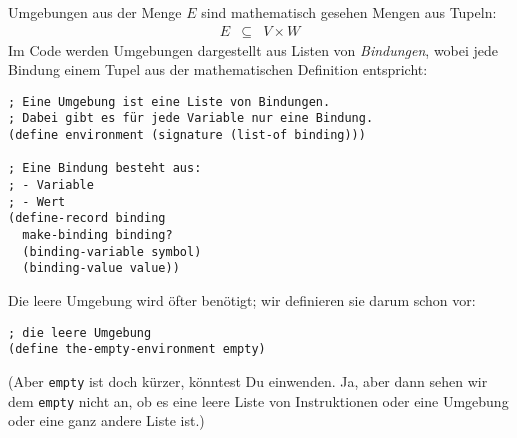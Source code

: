 Umgebungen aus der Menge $E$ sind mathematisch gesehen Mengen aus
Tupeln:
%
\begin{eqnarray*}
  E &\subseteq& V\times W
\end{eqnarray*}
%
Im Code werden Umgebungen dargestellt aus Listen von
\textit{Bindungen}, wobei jede Bindung einem Tupel aus
der mathematischen Definition entspricht:
%
\begin{lstlisting}
; Eine Umgebung ist eine Liste von Bindungen.
; Dabei gibt es für jede Variable nur eine Bindung.
(define environment (signature (list-of binding)))

; Eine Bindung besteht aus:
; - Variable
; - Wert
(define-record binding
  make-binding binding?
  (binding-variable symbol)
  (binding-value value))
\end{lstlisting}
% 
Die leere Umgebung wird öfter benötigt; wir definieren sie darum schon
vor:
%
\begin{lstlisting}
; die leere Umgebung
(define the-empty-environment empty)
\end{lstlisting}
%
(Aber \lstinline{empty} ist doch kürzer, könntest Du einwenden.  Ja,
aber dann sehen wir dem \lstinline{empty} nicht an, ob es eine leere
Liste von Instruktionen oder eine Umgebung oder eine ganz andere Liste
ist.)

